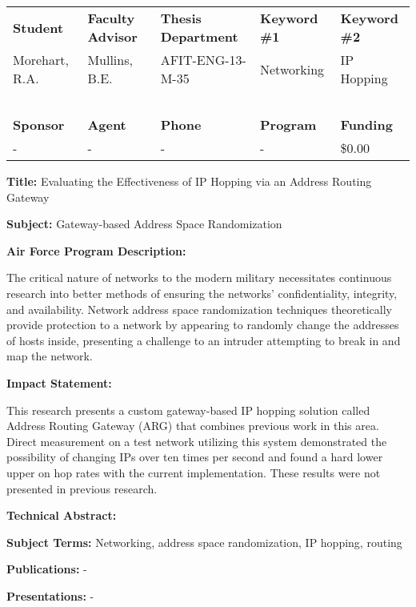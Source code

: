 \documentclass{article}
\begin{document}


\begin{tabular}{lllll}
\textbf{Student} & \textbf{Faculty Advisor} & \textbf{Thesis Department} & \textbf{Keyword \#1} & \textbf{Keyword \#2}\\
Morehart, R.A. & Mullins, B.E. & AFIT-ENG-13-M-35 & Networking & IP Hopping\\
~\\
\textbf{Sponsor} & \textbf{Agent} & \textbf{Phone} & \textbf{Program} & \textbf{Funding}\\
- & - & - & - & \$0.00\\
\end{tabular}

\begin{center}
\textbf{Title:} Evaluating the Effectiveness of IP Hopping via an Address Routing Gateway
\end{center}

\textbf{Subject:} Gateway-based Address Space Randomization

\textbf{Air Force Program Description:}

The critical nature of networks to the modern military necessitates continuous research into better methods of ensuring the networks' confidentiality, integrity, and availability. Network address space randomization techniques theoretically provide protection to a network by appearing to randomly change the addresses of hosts inside, presenting a challenge to an intruder attempting to break in and map the network. 

\textbf{Impact Statement:}

This research presents a custom gateway-based IP hopping solution called Address Routing Gateway (ARG) that combines previous work in this area. Direct measurement on a test network utilizing this system demonstrated the possibility of changing IPs over ten times per second and found a hard lower upper on hop rates with the current implementation. These results were not presented in previous research.

\textbf{Technical Abstract:}

\textbf{Subject Terms:} Networking, address space randomization, IP hopping, routing

\textbf{Publications:}
-

\textbf{Presentations:}
-
\end{document}

